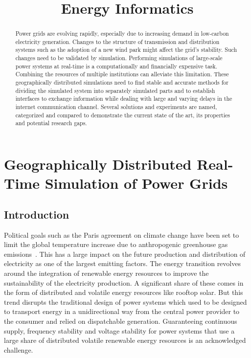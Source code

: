 \documentclass[a4paper]{atseminar}
\title{Energy Informatics}
\author{}
\begin{document}
\maketitle

\ENGLISH

\section{Geographically Distributed Real-Time Simulation of Power Grids}

\begin{abstract}
Power grids are evolving rapidly, especially due to increasing demand in low-carbon electricity generation. Changes to the structure of transmission and distribution systems such as the adoption of a new wind park might affect the grid's stability. Such changes need to be validated by simulation. Performing simulations of large-scale power systems at real-time is a computationally and financially expensive task. Combining the resources of multiple institutions can alleviate this limitation. 
These geographically distributed simulations need to find stable and accurate methods for dividing the simulated system into separately simulated parts and to establish interfaces to exchange information while dealing with large and varying delays in the internet communication channel. Several solutions and experiments are named, categorized and compared to demonstrate the current state of the art, its properties and potential research gaps.
\end{abstract}

\subsection{Introduction}

Political goals such as the Paris agreement on climate change have been set to limit the global temperature increase due to anthropogenic greenhouse gas emissions~\cite{paris-climate-agreement}. This has a large impact on the future production and distribution of electricity as one of the largest emitting factors. The energy transition revolves around the integration of renewable energy resources to improve the sustainability of the electricity production. A significant share of these comes in the form of distributed and volatile energy resources like rooftop solar.
But this trend disrupts the traditional design of power systems which used to be designed to transport energy in a unidirectional way from the central power provider to the consumer and relied on dispatchable generation. Guaranteeing continuous supply, frequency stability and voltage stability for power systems that use a large share of distributed volatile renewable energy resources is an acknowledged challenge.
\end{document}
